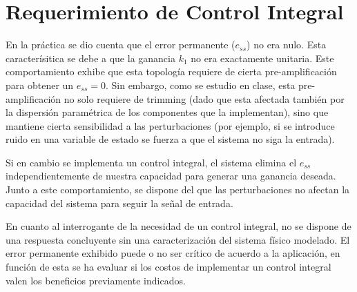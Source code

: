 \section{Requerimiento de Control Integral}

En la práctica se dio cuenta que el error permanente ($e_{ss}$) no era nulo. Esta caracterísitica se debe a que la ganancia $k_1$ no era exactamente unitaria. Este comportamiento exhibe que esta topología requiere de cierta pre-amplificación para obtener un $e_{ss}=0$. Sin embargo, como se estudio en clase, esta pre-amplificación no solo requiere de trimming (dado que esta afectada también por la dispersión paramétrica de los componentes que la implementan), sino que mantiene cierta sensibilidad a las perturbaciones (por ejemplo, si se introduce ruido en una variable de estado se fuerza a que el sistema no siga la entrada). 

Si en cambio se implementa un control integral, el sistema elimina el $e_{ss}$ independientemente de nuestra capacidad para generar una ganancia deseada. Junto a este comportamiento, se dispone del que las perturbaciones no afectan la capacidad del sistema para seguir la señal de entrada.

En cuanto al interrogante de la necesidad de un control integral, no se dispone de una respuesta concluyente sin una caracterización del sistema físico modelado. El error permanente exhibido puede o no ser crítico de acuerdo a la aplicación, en función de esta se ha evaluar si los costos de implementar un control integral valen los beneficios previamente indicados.